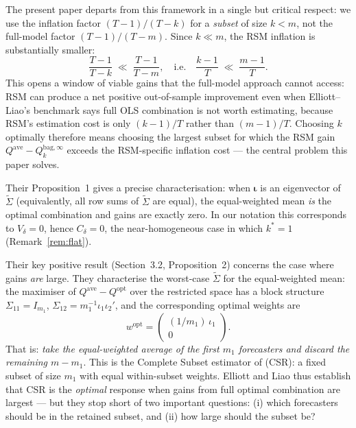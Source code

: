 \documentclass[12pt,a4paper]{article}
\theoremstyle{definition}
\newcommand{\Qopt}{Q^{\mathrm{opt}}}
\newcommand{\Qave}{Q^{\mathrm{ave}}}
\newcommand{\Qbag}{Q_k^{\mathrm{bag},\infty}}
\begin{document}
The present paper departs from this framework in a single but critical
respect: we use the inflation factor $(T-1)/(T-k)$ for a \emph{subset}
of size $k<m$, not the full-model factor $(T-1)/(T-m)$.  Since $k\ll m$,
the RSM inflation is substantially smaller:
\begin{equation}\label{eq:rsm_inflation_advantage}
  \frac{T-1}{T-k} \;\ll\; \frac{T-1}{T-m},
  \quad\text{i.e.}\quad
  \frac{k-1}{T} \;\ll\; \frac{m-1}{T}.
\end{equation}
This opens a window of viable gains that the full-model approach cannot
access: RSM can produce a net positive out-of-sample improvement even when
Elliott--Liao's benchmark says full OLS combination is not worth estimating,
because RSM's estimation cost is only $(k-1)/T$ rather than $(m-1)/T$.
Choosing $k$ optimally therefore means choosing the largest subset for
which the RSM gain $\Qave-\Qbag$ exceeds the RSM-specific inflation cost
--- the central problem this paper solves.

Their Proposition~1 gives a precise characterisation: when $\bm{\iota}$
is an eigenvector of $\tilde\Sigma$ (equivalently, all row sums of
$\tilde\Sigma$ are equal), the equal-weighted mean \emph{is} the optimal
combination and gains are exactly zero.  In our notation this corresponds
to $V_\delta=0$, hence $C_\delta=0$, the near-homogeneous case in which
$k^*=1$ (Remark~\ref{rem:flat}).

Their key positive result (Section~3.2, Proposition~2) concerns the case
where gains \emph{are} large.  They characterise the worst-case $\tilde\Sigma$
for the equal-weighted mean: the maximiser of $\Qave-\Qopt$ over the
restricted space has a block structure
$\Sigma_{11}=I_{m_1}$, $\Sigma_{12}=m_1^{-1}\iota_1\iota_2'$, and the
corresponding optimal weights are
\begin{equation}\label{eq:EL_wopt}
  w^{\mathrm{opt}} = \begin{pmatrix}(1/m_1)\,\iota_1 \\ 0\end{pmatrix}.
\end{equation}
That is: \emph{take the equal-weighted average of the first $m_1$
forecasters and discard the remaining $m-m_1$}.  This is the
Complete Subset estimator of \citet{ElliottGarganoTimmermann2013} (CSR):
a fixed subset of size $m_1$ with equal within-subset weights.  Elliott
and Liao thus establish that CSR is the \emph{optimal} response when gains
from full optimal combination are largest --- but they stop short of two
important questions: (i) which forecasters should be in the retained
subset, and (ii) how large should the subset be?
\end{document}

